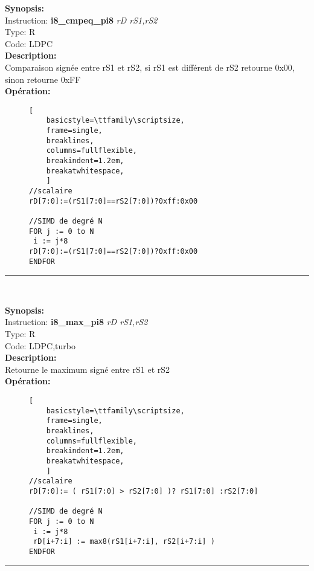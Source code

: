 {\scriptsize
\textbf{Synopsis:}\\
Instruction: \textbf{i8\_cmpeq\_pi8 } \textit{rD rS1,rS2}\\
Type: R\\
Code: LDPC\\
\textbf{Description:}\\
Comparaison signée entre rS1 et rS2, si rS1 est différent de rS2 retourne 0x00, sinon retourne 0xFF\\
\textbf{Opération:}\\
    \begin{figure}[H]
    \begin{lstlisting}[
    basicstyle=\ttfamily\scriptsize,
    frame=single,
    breaklines,
    columns=fullflexible,
    breakindent=1.2em,
    breakatwhitespace,
    ]
//scalaire
rD[7:0]:=(rS1[7:0]==rS2[7:0])?0xff:0x00
    
//SIMD de degré N
FOR j := 0 to N    
 i := j*8    
rD[7:0]:=(rS1[7:0]==rS2[7:0])?0xff:0x00
ENDFOR
\end{lstlisting}
\end{figure}
}
\rule{8cm}{0.4pt}\\
{\scriptsize
\textbf{Synopsis:}\\
Instruction: \textbf{i8\_max\_pi8 } \textit{rD rS1,rS2}\\
Type: R\\
Code: LDPC,turbo\\
\textbf{Description:}\\
Retourne le maximum signé entre rS1 et rS2\\
\textbf{Opération:}\\
    \begin{figure}[H]
    \begin{lstlisting}[
    basicstyle=\ttfamily\scriptsize,
    frame=single,
    breaklines,
    columns=fullflexible,
    breakindent=1.2em,
    breakatwhitespace,
    ]
//scalaire
rD[7:0]:= ( rS1[7:0] > rS2[7:0] )? rS1[7:0] :rS2[7:0]
    
//SIMD de degré N
FOR j := 0 to N  
 i := j*8    
 rD[i+7:i] := max8(rS1[i+7:i], rS2[i+7:i] ) 
ENDFOR
\end{lstlisting}
\end{figure}
}
\rule{8cm}{0.4pt}\\

